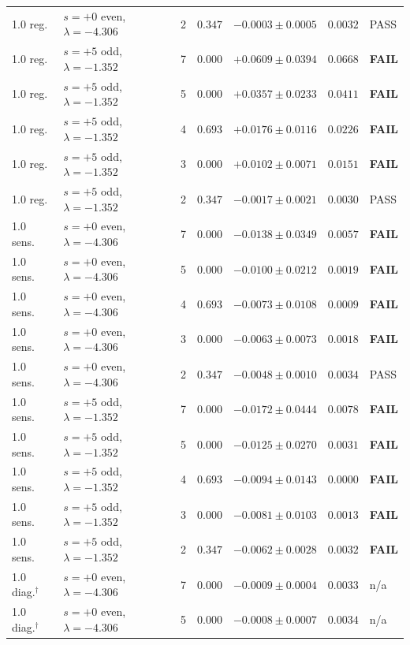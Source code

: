 \begin{tabular}{llrrlll}
1.0 reg. & $s=+0$ even, $\lambda=-4.306$ & 2 & $0.347$ & $-0.0003\pm0.0005$ & $0.0032$ & PASS \\
1.0 reg. & $s=+5$ odd, $\lambda=-1.352$ & 7 & $0.000$ & $+0.0609\pm0.0394$ & $0.0668$ & \textbf{FAIL} \\
1.0 reg. & $s=+5$ odd, $\lambda=-1.352$ & 5 & $0.000$ & $+0.0357\pm0.0233$ & $0.0411$ & \textbf{FAIL} \\
1.0 reg. & $s=+5$ odd, $\lambda=-1.352$ & 4 & $0.693$ & $+0.0176\pm0.0116$ & $0.0226$ & \textbf{FAIL} \\
1.0 reg. & $s=+5$ odd, $\lambda=-1.352$ & 3 & $0.000$ & $+0.0102\pm0.0071$ & $0.0151$ & \textbf{FAIL} \\
1.0 reg. & $s=+5$ odd, $\lambda=-1.352$ & 2 & $0.347$ & $-0.0017\pm0.0021$ & $0.0030$ & PASS \\
1.0 sens. & $s=+0$ even, $\lambda=-4.306$ & 7 & $0.000$ & $-0.0138\pm0.0349$ & $0.0057$ & \textbf{FAIL} \\
1.0 sens. & $s=+0$ even, $\lambda=-4.306$ & 5 & $0.000$ & $-0.0100\pm0.0212$ & $0.0019$ & \textbf{FAIL} \\
1.0 sens. & $s=+0$ even, $\lambda=-4.306$ & 4 & $0.693$ & $-0.0073\pm0.0108$ & $0.0009$ & \textbf{FAIL} \\
1.0 sens. & $s=+0$ even, $\lambda=-4.306$ & 3 & $0.000$ & $-0.0063\pm0.0073$ & $0.0018$ & \textbf{FAIL} \\
1.0 sens. & $s=+0$ even, $\lambda=-4.306$ & 2 & $0.347$ & $-0.0048\pm0.0010$ & $0.0034$ & PASS \\
1.0 sens. & $s=+5$ odd, $\lambda=-1.352$ & 7 & $0.000$ & $-0.0172\pm0.0444$ & $0.0078$ & \textbf{FAIL} \\
1.0 sens. & $s=+5$ odd, $\lambda=-1.352$ & 5 & $0.000$ & $-0.0125\pm0.0270$ & $0.0031$ & \textbf{FAIL} \\
1.0 sens. & $s=+5$ odd, $\lambda=-1.352$ & 4 & $0.693$ & $-0.0094\pm0.0143$ & $0.0000$ & \textbf{FAIL} \\
1.0 sens. & $s=+5$ odd, $\lambda=-1.352$ & 3 & $0.000$ & $-0.0081\pm0.0103$ & $0.0013$ & \textbf{FAIL} \\
1.0 sens. & $s=+5$ odd, $\lambda=-1.352$ & 2 & $0.347$ & $-0.0062\pm0.0028$ & $0.0032$ & \textbf{FAIL} \\
1.0 diag.$^\dagger$ & $s=+0$ even, $\lambda=-4.306$ & 7 & $0.000$ & $-0.0009\pm0.0004$ & $0.0033$ & n/a \\
1.0 diag.$^\dagger$ & $s=+0$ even, $\lambda=-4.306$ & 5 & $0.000$ & $-0.0008\pm0.0007$ & $0.0034$ & n/a \\

\end{tabular}
